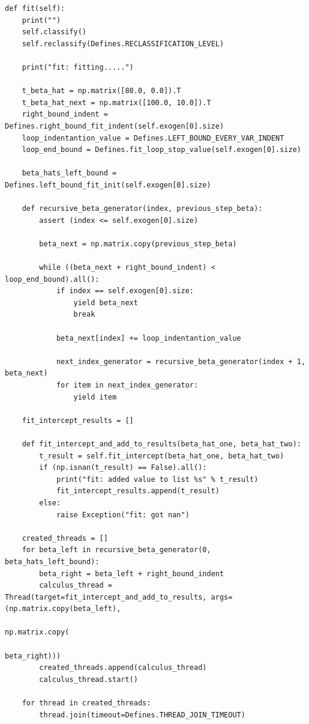 \documentclass[a4paper,14pt]{extarticle}
\begin{document}
\begin{Verbatim}[fontsize=\scriptsize]
def fit(self):
    print("")
    self.classify()
    self.reclassify(Defines.RECLASSIFICATION_LEVEL)

    print("fit: fitting.....")

    t_beta_hat = np.matrix([80.0, 0.0]).T
    t_beta_hat_next = np.matrix([100.0, 10.0]).T
    right_bound_indent = Defines.right_bound_fit_indent(self.exogen[0].size)
    loop_indentantion_value = Defines.LEFT_BOUND_EVERY_VAR_INDENT
    loop_end_bound = Defines.fit_loop_stop_value(self.exogen[0].size)

    beta_hats_left_bound = Defines.left_bound_fit_init(self.exogen[0].size)

    def recursive_beta_generator(index, previous_step_beta):
        assert (index <= self.exogen[0].size)

        beta_next = np.matrix.copy(previous_step_beta)

        while ((beta_next + right_bound_indent) < loop_end_bound).all():
            if index == self.exogen[0].size:
                yield beta_next
                break

            beta_next[index] += loop_indentantion_value

            next_index_generator = recursive_beta_generator(index + 1, beta_next)
            for item in next_index_generator:
                yield item

    fit_intercept_results = []

    def fit_intercept_and_add_to_results(beta_hat_one, beta_hat_two):
        t_result = self.fit_intercept(beta_hat_one, beta_hat_two)
        if (np.isnan(t_result) == False).all():
            print("fit: added value to list %s" % t_result)
            fit_intercept_results.append(t_result)
        else:
            raise Exception("fit: got nan")

    created_threads = []
    for beta_left in recursive_beta_generator(0, beta_hats_left_bound):
        beta_right = beta_left + right_bound_indent
        calculus_thread = Thread(target=fit_intercept_and_add_to_results, args=(np.matrix.copy(beta_left),
                                                                                np.matrix.copy(
                                                                                    beta_right)))
        created_threads.append(calculus_thread)
        calculus_thread.start()

    for thread in created_threads:
        thread.join(timeout=Defines.THREAD_JOIN_TIMEOUT)


\end{Verbatim}
\end{document}
